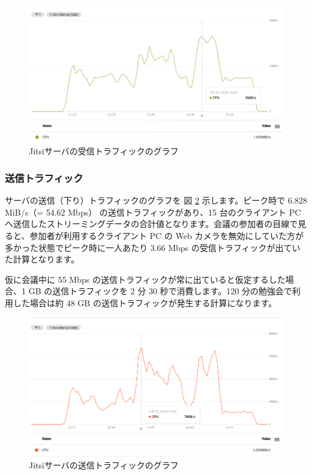 \documentclass[mingoth,a4paper]{jsarticle}
\begin{document}
\begin{figure}[h]
\begin{center}
\includegraphics[keepaspectratio,width=0.75\hsize]{image202004/jitsi_perf_nw_recv-byte.png}
\end{center}
\caption{Jitsiサーバの受信トラフィックのグラフ}
\label{fig:graph_jitsi-traffic-recv}
\end{figure}


\subsubsection{送信トラフィック}

サーバの送信（下り）トラフィックのグラフを 図 \ref{fig:graph_jitsi-traffic-send} 示します。ピーク時で 6.828 MiB/s（= 54.62 Mbps） の送信トラフィックがあり、15 台のクライアント PC へ送信したストリーミングデータの合計値となります。会議の参加者の目線で見ると、参加者が利用するクライアント PC の Web カメラを無効にしていた方が多かった状態でピーク時に一人あたり 3.66 Mbps の受信トラフィックが出ていた計算となります。

仮に会議中に 55 Mbps の送信トラフィックが常に出ていると仮定するした場合、1 GB の送信トラフィックを 2 分 30 秒で消費します。120 分の勉強会で利用した場合は約 48 GB の送信トラフィックが発生する計算になります。

\begin{figure}[h]
\begin{center}
\includegraphics[keepaspectratio,width=0.75\hsize]{image202004/jitsi_perf_nw_send-byte.png}
\end{center}
\caption{Jitsiサーバの送信トラフィックのグラフ}
\label{fig:graph_jitsi-traffic-send}
\end{figure}
\end{document}
